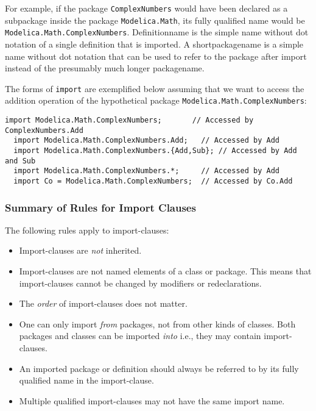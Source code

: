 \begin{nonnormative}
For example, if the package \lstinline!ComplexNumbers! would have
been declared as a subpackage inside the package \lstinline!Modelica.Math!,
its fully qualified name would be \lstinline!Modelica.Math.ComplexNumbers!.
Definitionname is the simple name without dot notation of a single
definition that is imported. A shortpackagename is a simple name without
dot notation that can be used to refer to the package after import
instead of the presumably much longer packagename.

The forms of \lstinline!import! are exemplified below assuming that we want to
access the addition operation of the hypothetical package \lstinline!Modelica.Math.ComplexNumbers!:
\begin{lstlisting}[language=modelica]
  import Modelica.Math.ComplexNumbers;       // Accessed by ComplexNumbers.Add
  import Modelica.Math.ComplexNumbers.Add;   // Accessed by Add
  import Modelica.Math.ComplexNumbers.{Add,Sub}; // Accessed by Add and Sub
  import Modelica.Math.ComplexNumbers.*;     // Accessed by Add
  import Co = Modelica.Math.ComplexNumbers;  // Accessed by Co.Add
\end{lstlisting}
\end{nonnormative}

\subsubsection{Summary of Rules for Import Clauses}

The following rules apply to import-clauses:
\begin{itemize}
\item
  Import-clauses are \emph{not} inherited.
\item
  Import-clauses are not named elements of a class or package. This
  means that import-clauses cannot be changed by modifiers or
  redeclarations.
\item
  The \emph{order} of import-clauses does not matter.
\item
  One can only import \emph{from} packages, not from other kinds of
  classes. Both packages and classes can be imported \emph{into} i.e.,
  they may contain import-clauses.
\item
  An imported package or definition should always be referred to by its
  fully qualified name in the import-clause.
\item
  Multiple qualified import-clauses may not have the same import name.
\end{itemize}

